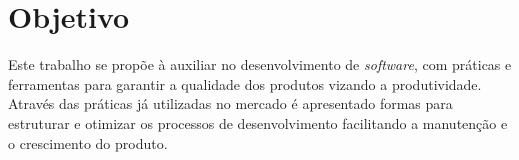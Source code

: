 \chapter{Objetivo}
Este trabalho se propõe à auxiliar no desenvolvimento de \textit{software},
com práticas e ferramentas para garantir a qualidade dos produtos vizando a
produtividade. Através das práticas já utilizadas no mercado é apresentado
formas para estruturar e otimizar os processos de desenvolvimento facilitando a
manutenção e o crescimento do produto.
